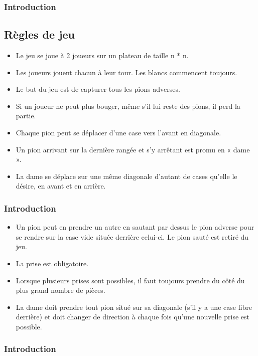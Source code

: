 \documentclass{beamer}
\begin{document}
\begin{frame}
  \frametitle{Introduction}

  \subsection{Règles de jeu}

  \begin{itemize}
    \item Le jeu se joue à 2 joueurs sur un plateau de taille n * n.
    \item Les joueurs jouent chacun à leur tour. Les blancs commencent toujours.
    \item Le but du jeu est de capturer tous les pions adverses. 
    \item Si un joueur ne peut plus bouger, même s'il lui reste des pions, il perd la partie. 
    \item Chaque pion peut se déplacer d'une case vers l'avant en diagonale. 
    \item Un pion arrivant sur la dernière rangée et s'y arrêtant est promu en « dame ».
    \item La dame se déplace sur une même diagonale d'autant de cases qu'elle le désire, en avant et en arrière.
  
  \end{itemize}

\end{frame}

\begin{frame}
  \frametitle{Introduction}
  \begin{itemize}
    \item Un pion peut en prendre un autre en sautant par dessus le pion adverse
     pour se rendre sur la case vide située derrière celui-ci. Le pion sauté est retiré du jeu.
    \item La prise est obligatoire.
    \item Lorsque plusieurs prises sont possibles, 
    il faut toujours prendre du côté du plus grand nombre de pièces.
    \item La dame doit prendre tout pion situé sur sa diagonale 
    (s'il y a une case libre derrière) et doit changer de direction à chaque 
    fois qu'une  nouvelle prise est possible. 
  \end{itemize}
\end{frame}

\begin{frame}
  \frametitle{Introduction}
\end{frame}
\end{document}

